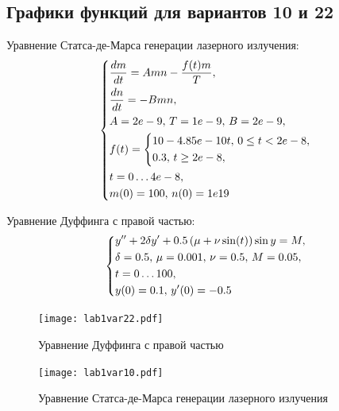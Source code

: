 \documentclass[12pt, a4paper]{article}
\begin{document}
	\subsection*{Графики функций для вариантов 10 и 22}
	Уравнение Статса-де-Марса генерации лазерного излучения:
	\[
	\begin{dcases}
		\frac{dm}{dt} = Amn - \frac{f(t) m}{T},\\
		\frac{dn}{dt} = -Bmn,\\ 
		A = 2e-9, \, T = 1e-9, \, B = 2e-9,\\
		f(t) = 
		\begin{dcases}
			10 - 4.85e-10t, \, 0 \leq t < 2e-8,\\
			0.3, \, t \geq 2e-8,
		\end{dcases}\\
		t = 0\dots4e-8,\\
		m(0) = 100, \, n(0)=1e19
	\end{dcases}
	\]

	Уравнение Дуффинга с правой частью:
	\[
	\begin{dcases}
		y'' + 2 \delta y' + 0.5 \left( \mu + \nu \sin (t)\right) \sin y = M,\\
		\delta = 0.5, \, \mu = 0.001, \, \nu = 0.5, \, M=0.05,\\
		t = 0\dots100,\\
		y(0)=0.1, \, y'(0) = -0.5
	\end{dcases}
	\]
	\begin{figure}[H]
		\begin{minipage}[b]{0.45\linewidth}
			\centering
			\texttt{[image: lab1var22.pdf]}
			\caption{Уравнение Дуффинга с правой частью}
			\label{rrr}
		  \end{minipage}
		  \hfill
		  \begin{minipage}[b]{0.45\linewidth}
			\centering
			\texttt{[image: lab1var10.pdf]}
			\caption{Уравнение Статса-де-Марса генерации лазерного излучения}
			\label{ttt}
		  \end{minipage}
	\end{figure}
\end{document}
